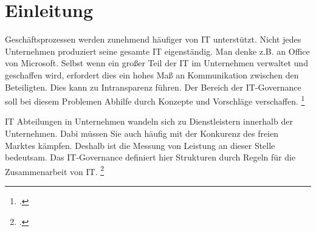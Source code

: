 \section{Einleitung}
Geschäftsprozessen werden zunehmend häufiger von IT unterstützt. Nicht jedes Unternehmen produziert seine gesamte IT eigenständig. Man denke z.B. an Office von Microsoft. Selbst wenn ein großer Teil der IT im Unternehmen verwaltet und geschaffen wird, erfordert dies ein hohes Maß an Kommunikation zwischen den Beteiligten. Dies kann zu Intransparenz führen. Der Bereich der IT-Governance soll bei diesem Problemen Abhilfe durch Konzepte und Vorschläge verschaffen. \footcite[Vgl.][445]{meyer_it-governance_2003}

IT Abteilungen in Unternehmen wandeln sich zu Dienstleistern innerhalb der Unternehmen. Dabi müssen Sie auch häufig mit der Konkurenz des freien Marktes kämpfen. Deshalb ist die Messung von Leistung an dieser Stelle bedeutsam. Das IT-Governance definiert hier Strukturen durch Regeln für die Zusammenarbeit von IT. \footcite[Vgl.][446\psq]{meyer_it-governance_2003}


